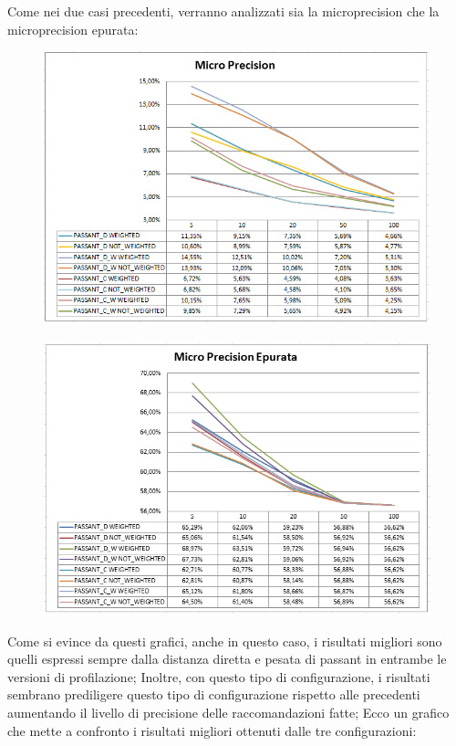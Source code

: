 Come nei due casi precedenti, verranno analizzati sia la microprecision che la microprecision epurata:
\begin{figure}[H]
	\includegraphics[width=.9\textwidth]{./images/graphs/micro_prec_Best}
\end{figure}

\begin{figure}[H]
	\includegraphics[width=.9\textwidth]{./images/graphs/micro_precT_Best}
\end{figure}

Come si evince da questi grafici, anche in questo caso, i risultati migliori sono quelli espressi sempre dalla distanza diretta e pesata di passant in entrambe le versioni di profilazione; Inoltre, con questo tipo di configurazione, i risultati sembrano prediligere questo tipo di configurazione rispetto alle precedenti aumentando il livello di precisione delle raccomandazioni fatte; Ecco un grafico che mette a confronto i risultati migliori ottenuti dalle tre configurazioni:

